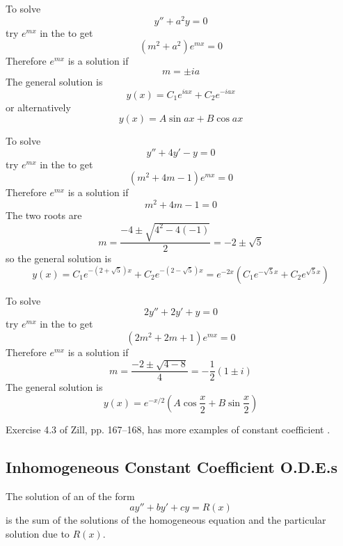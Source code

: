 \begin{example}
To solve
$$y''+a^2y=0$$
try $e^{mx}$ in the \ODE to get
$$(m^2+a^2)e^{mx}=0$$
Therefore $e^{mx}$ is a solution if
$$m=\pm ia$$
The general solution is
$$y(x)=C_1e^{iax}+C_2e^{-iax}$$
or alternatively
$$y(x)=A\sin ax + B\cos ax$$
\end{example}

\begin{example}
To solve
$$y''+4y'-y=0$$
try $e^{mx}$ in the \ODE to get
$$(m^2+4m-1)e^{mx}=0$$
Therefore $e^{mx}$ is a solution if
$$m^2+4m-1=0$$
The two roots are
$$m=\frac{-4\pm\sqrt{4^2-4(-1)}}{2}=-2\pm\sqrt{5}$$
so the general solution is
$$y(x)=C_1e^{-(2+\sqrt{5})x}+C_2e^{-(2-\sqrt{5})x}
=e^{-2x}\left(C_1e^{-\sqrt{5}x}+C_2e^{\sqrt{5}x}\right)$$
\end{example}

\begin{example}
To solve
$$2y''+2y'+y=0$$
try $e^{mx}$ in the \ODE to get
$$(2m^2+2m+1)e^{mx}=0$$
Therefore $e^{mx}$ is a solution if
$$m=\frac{-2\pm\sqrt{4-8}}{4}=-\frac{1}{2}(1\pm i)$$
The general solution is
$$y(x)=e^{-x/2}\left(A\cos\frac{x}{2} + B\sin\frac{x}{2}\right)$$
\end{example}

\begin{exercise}
Exercise 4.3 of Zill, pp. 167--168, has more examples of constant
coefficient \ODEs.
\end{exercise}

\subsection{Inhomogeneous Constant Coefficient O.D.E.s}

The solution of an \ODE of the form
$$ay''+by'+cy=R(x)$$
is the sum of the solutions of the homogeneous equation and the particular
solution due to $R(x)$.

